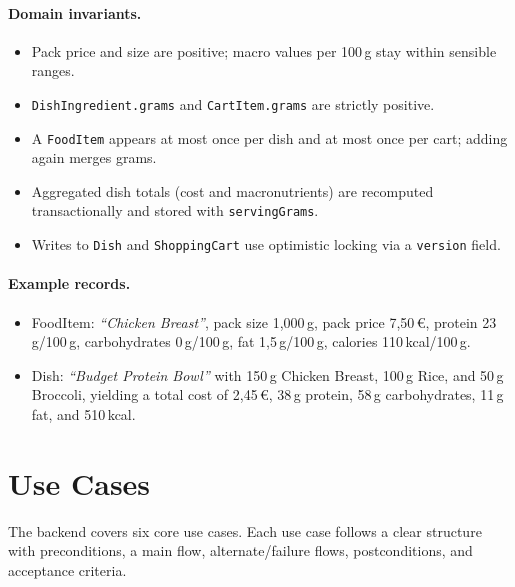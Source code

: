 \documentclass[11pt]{article}
\begin{document}
\paragraph{Domain invariants.}
\begin{itemize}[noitemsep]
  \item Pack price and size are positive; macro values per 100\,g stay within sensible ranges.
  \item \texttt{DishIngredient.grams} and \texttt{CartItem.grams} are strictly positive.
  \item A \texttt{FoodItem} appears at most once per dish and at most once per cart; adding again merges grams.
  \item Aggregated dish totals (cost and macronutrients) are recomputed transactionally and stored with \texttt{servingGrams}.
  \item Writes to \texttt{Dish} and \texttt{ShoppingCart} use optimistic locking via a \texttt{version} field.
\end{itemize}

\paragraph{Example records.}
\begin{itemize}[noitemsep]
  \item FoodItem: \emph{``Chicken Breast''}, pack size 1{,}000\,g, pack price 7{,}50\,€, protein 23\,g/100\,g, carbohydrates 0\,g/100\,g, fat 1{,}5\,g/100\,g, calories 110\,kcal/100\,g.
  \item Dish: \emph{``Budget Protein Bowl''} with 150\,g Chicken Breast, 100\,g Rice, and 50\,g Broccoli, yielding a total cost of 2{,}45\,€, 38\,g protein, 58\,g carbohydrates, 11\,g fat, and 510\,kcal.
\end{itemize}

\section{Use Cases}

The backend covers six core use cases. Each use case follows a clear structure with preconditions, a main flow, alternate/failure flows, postconditions, and acceptance criteria.
\end{document}

